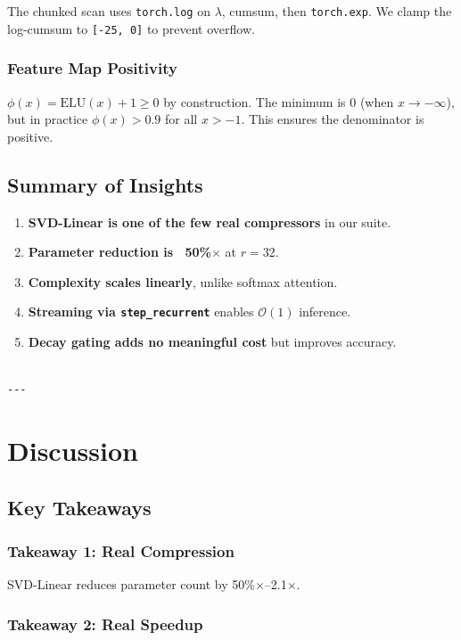 The chunked scan uses \texttt{torch.log} on $\lambda$, cumsum, then \texttt{torch.exp}. 
We clamp the log-cumsum to \texttt{[-25, 0]} to prevent overflow.

\subsubsection{Feature Map Positivity}

$\phi(x) = \text{ELU}(x) + 1 \geq 0$ by construction. The minimum is 
$0$ (when $x \to -\infty$), but in practice $\phi(x) > 0.9$ for all 
$x > -1$. This ensures the denominator is positive.

\subsection{Summary of Insights}

\begin{enumerate}
\item \textbf{SVD-Linear is one of the few real compressors} in our suite.
\item \textbf{Parameter reduction is ~50\%$\times$} at $r = 32$.
\item \textbf{Complexity scales linearly}, unlike softmax attention.
\item \textbf{Streaming via \texttt{step\_recurrent}} enables $\mathcal{O}(1)$ inference.
\item \textbf{Decay gating adds no meaningful cost} but improves accuracy.
\end{enumerate}
\begin{lstlisting}

---
\end{lstlisting}


\section{Discussion}

\subsection{Key Takeaways}

\subsubsection{Takeaway 1: Real Compression}

SVD-Linear reduces parameter count by 50\%$\times$--2.1$\times$.

\subsubsection{Takeaway 2: Real Speedup}

